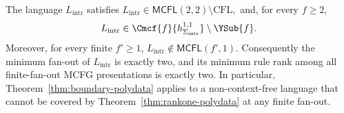 \begin{theorem}
\label{thm:intrinsic-ranktwo-witness}
The language $L_{\mathrm{intr}}$ satisfies
\(L_{\mathrm{intr}}\in\mathsf{MCFL}(2,2)\setminus\mathrm{CFL},\)
and, for every $f\ge2$,
\[
 L_{\mathrm{intr}}
 \in\Cmcf{f}{h_{\Sigma_{\mathrm{intr}}}^{1,1}}
 \setminus\YSub{f}.
\]
Moreover, for every finite $f'\ge1$,
\(L_{\mathrm{intr}}\notin\mathsf{MCFL}(f',1).\)
Consequently the minimum fan-out of $L_{\mathrm{intr}}$ is exactly two, and
its minimum rule rank among all finite-fan-out MCFG presentations is exactly
two.  In particular, Theorem~\ref{thm:boundary-polydata} applies to a
non-context-free language that cannot be covered by
Theorem~\ref{thm:rankone-polydata} at any finite fan-out.
\end{theorem}

